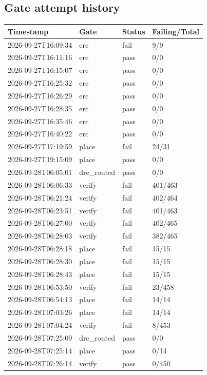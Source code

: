 \documentclass[11pt,a4paper]{article}
\begin{document}
\subsection*{Gate attempt history}
{\small
\begin{longtable}{llll}
\toprule
\textbf{Timestamp} & \textbf{Gate} & \textbf{Status} & \textbf{Failing/Total} \\
\midrule
\endhead
2026-09-27T16:09:34 & erc & fail & 9/9 \\
2026-09-27T16:11:16 & erc & pass & 0/0 \\
2026-09-27T16:15:07 & erc & pass & 0/0 \\
2026-09-27T16:25:32 & erc & pass & 0/0 \\
2026-09-27T16:26:29 & erc & pass & 0/0 \\
2026-09-27T16:28:35 & erc & pass & 0/0 \\
2026-09-27T16:35:46 & erc & pass & 0/0 \\
2026-09-27T16:40:22 & erc & pass & 0/0 \\
2026-09-27T17:19:59 & place & fail & 24/31 \\
2026-09-27T19:15:09 & place & pass & 0/0 \\
2026-09-28T06:05:01 & drc\_routed & pass & 0/0 \\
2026-09-28T06:06:33 & verify & fail & 401/463 \\
2026-09-28T06:21:24 & verify & fail & 402/464 \\
2026-09-28T06:23:51 & verify & fail & 401/463 \\
2026-09-28T06:27:00 & verify & fail & 402/465 \\
2026-09-28T06:28:03 & verify & fail & 382/465 \\
2026-09-28T06:28:18 & place & fail & 15/15 \\
2026-09-28T06:28:30 & place & fail & 15/15 \\
2026-09-28T06:28:43 & place & fail & 15/15 \\
2026-09-28T06:53:50 & verify & fail & 23/458 \\
2026-09-28T06:54:13 & place & fail & 14/14 \\
2026-09-28T07:03:26 & place & fail & 14/14 \\
2026-09-28T07:04:24 & verify & fail & 8/453 \\
2026-09-28T07:25:09 & drc\_routed & pass & 0/0 \\
2026-09-28T07:25:14 & place & pass & 0/14 \\
2026-09-28T07:26:14 & verify & pass & 0/450 \\

\end{longtable}}
\end{document}
